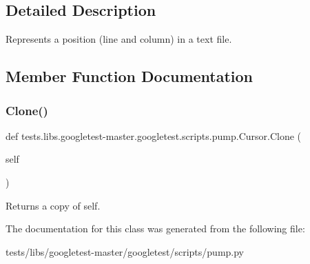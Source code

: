 \subsection{Detailed Description}
\begin{DoxyVerb}Represents a position (line and column) in a text file.\end{DoxyVerb}
 

\subsection{Member Function Documentation}
\mbox{\label{classtests_1_1libs_1_1googletest-master_1_1googletest_1_1scripts_1_1pump_1_1Cursor_aa82fbd6b394e0822f1e16fbac3a5ded3}} 
\subsubsection{\texorpdfstring{Clone()}{Clone()}}
{\footnotesize\ttfamily def tests.\+libs.\+googletest-\/master.\+googletest.\+scripts.\+pump.\+Cursor.\+Clone (\begin{DoxyParamCaption}\item[{}]{self }\end{DoxyParamCaption})}

\begin{DoxyVerb}Returns a copy of self.\end{DoxyVerb}
 

The documentation for this class was generated from the following file\+:\begin{DoxyCompactItemize}
\item 
tests/libs/googletest-\/master/googletest/scripts/pump.\+py\end{DoxyCompactItemize}
